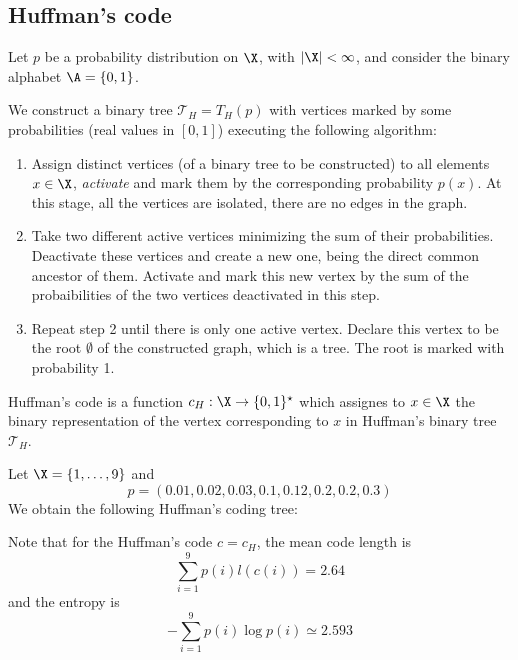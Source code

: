 \documentclass[toc]{../cs-classes/cs-classes}
\begin{document}
\subsection{Huffman's code}
Let $p$ be a probability distribution on $\X$, with $|\X|<\infty$, and consider the binary alphabet $\A=\{0, 1\}$.

\begin{definition}
    We construct a binary tree $\mathcal{T}_H = T_H(p)$ with vertices marked by some probabilities (real values in $[0, 1]$) executing the following algorithm:
    \begin{enumerate}
        \item Assign distinct vertices (of a binary tree to be constructed) to all elements $x\in\X$, \emph{activate} and mark them by the corresponding probability $p(x)$. At this stage, all the vertices are isolated, there are no edges in the graph.
        \item Take two different active vertices minimizing the sum of their probabilities. Deactivate these vertices and create a new one, being the direct common ancestor of them. Activate and mark this new vertex by the sum of the probaibilities of the two vertices deactivated in this step.
        \item Repeat step 2 until there is only one active vertex. Declare this vertex to be the root $\emptyset$ of the constructed graph, which is a tree. The root is marked with probability 1.
    \end{enumerate}
\end{definition}

\begin{definition}
    Huffman's code is a function $c_H:\X\to\{0, 1\}^\star$ which assignes to $x\in\X$ the binary representation of the vertex corresponding to $x$ in Huffman's binary tree $\mathcal{T}_H$.
\end{definition}

\begin{example}
    Let $\X=\{1, \dots, 9\}$ and 
    \begin{equation*}
        p=(0.01, 0.02, 0.03, 0.1, 0.12, 0.2, 0.2, 0.3)
    \end{equation*}
    We obtain the following Huffman's coding tree:

    Note that for the Huffman's code $c=c_H$, the mean code length is
    \begin{equation*}
        \sum_{i=1}^9 p(i)l(c(i))=2.64
    \end{equation*}
    and the entropy is
    \begin{equation*}
        -\sum_{i=1}^9 p(i)\log p(i)\simeq 2.593
    \end{equation*}
\end{example}
\end{document}
